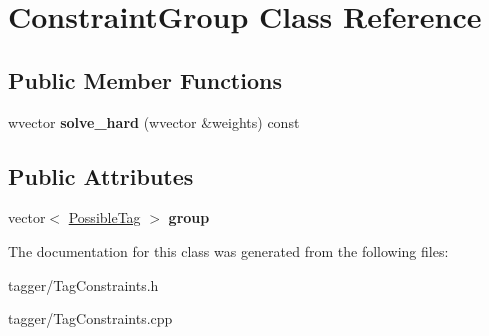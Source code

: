 \hypertarget{class_constraint_group}{
\section{ConstraintGroup Class Reference}
\label{class_constraint_group}
}
\subsection*{Public Member Functions}
\begin{DoxyCompactItemize}
\item 
\hypertarget{class_constraint_group_a4f37823a56e405c16148c0ba6ae7f114}{
wvector {\bfseries solve\_\-hard} (wvector \&weights) const }
\label{class_constraint_group_a4f37823a56e405c16148c0ba6ae7f114}

\end{DoxyCompactItemize}
\subsection*{Public Attributes}
\begin{DoxyCompactItemize}
\item 
\hypertarget{class_constraint_group_ac96c45d3b2c4c1a6e1068837bc024d9c}{
vector$<$ \hyperlink{struct_possible_tag}{PossibleTag} $>$ {\bfseries group}}
\label{class_constraint_group_ac96c45d3b2c4c1a6e1068837bc024d9c}

\end{DoxyCompactItemize}


The documentation for this class was generated from the following files:\begin{DoxyCompactItemize}
\item 
tagger/TagConstraints.h\item 
tagger/TagConstraints.cpp\end{DoxyCompactItemize}
